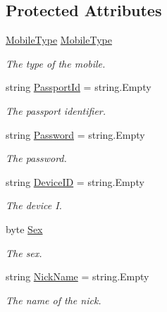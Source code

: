 \subsection*{Protected Attributes}
\begin{DoxyCompactItemize}
\item 
\mbox{\hyperlink{namespace_t_net_1_1_service_a4153b2b37cffc4fde5d14a462ea83c7b}{Mobile\+Type}} \mbox{\hyperlink{class_t_net_1_1_contract_1_1_action_1_1_login_action_ad997a94914fad1a688f53680f45c0505}{Mobile\+Type}}
\begin{DoxyCompactList}\small\item\em The type of the mobile. \end{DoxyCompactList}\item 
string \mbox{\hyperlink{class_t_net_1_1_contract_1_1_action_1_1_login_action_a1d4dc6d3e381c37f7654307f3b8cf0c6}{Passport\+Id}} = string.\+Empty
\begin{DoxyCompactList}\small\item\em The passport identifier. \end{DoxyCompactList}\item 
string \mbox{\hyperlink{class_t_net_1_1_contract_1_1_action_1_1_login_action_a9d05ce4cc7ab75c68bdf4ea07a5c55cb}{Password}} = string.\+Empty
\begin{DoxyCompactList}\small\item\em The password. \end{DoxyCompactList}\item 
string \mbox{\hyperlink{class_t_net_1_1_contract_1_1_action_1_1_login_action_a9f4abc568b75ffa5f79441be185f6785}{Device\+ID}} = string.\+Empty
\begin{DoxyCompactList}\small\item\em The device I. \end{DoxyCompactList}\item 
byte \mbox{\hyperlink{class_t_net_1_1_contract_1_1_action_1_1_login_action_a4e2689358001d253efde345a1eaecf92}{Sex}}
\begin{DoxyCompactList}\small\item\em The sex. \end{DoxyCompactList}\item 
string \mbox{\hyperlink{class_t_net_1_1_contract_1_1_action_1_1_login_action_ac707e0eb8ef3c023be38ae1855c46189}{Nick\+Name}} = string.\+Empty
\begin{DoxyCompactList}\small\item\em The name of the nick. \end{DoxyCompactList}\item 

\end{DoxyCompactItemize}
